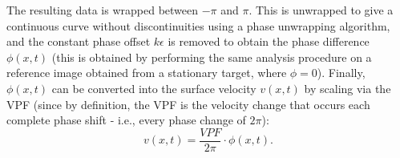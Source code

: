 The resulting data is wrapped between $-\pi$ and $\pi$. This is unwrapped to give a continuous curve without discontinuities using a phase unwrapping algorithm, and the constant phase offset $k\epsilon$ is removed to obtain the phase difference $\phi(x,t)$ (this is obtained by performing the same analysis procedure on a reference image obtained from a stationary target, where $\phi = 0$). Finally, $\phi(x,t)$ can be converted into the surface velocity $v(x,t)$ by scaling via the VPF (since by definition, the VPF is the velocity change that occurs each complete phase shift - i.e., every phase change of $2\pi$):
\begin{equation} v(x,t) = \frac{VPF}{2\pi} \cdot \phi(x,t). \end{equation}
